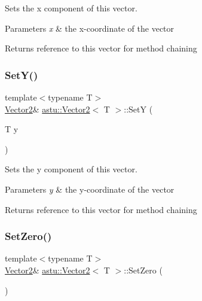 Sets the x component of this vector.


\begin{DoxyParams}{Parameters}
{\em x} & the x-\/coordinate of the vector \\
\hline
\end{DoxyParams}
\begin{DoxyReturn}{Returns}
reference to this vector for method chaining 
\end{DoxyReturn}
\mbox{\label{classastu_1_1Vector2_af454152e76948f63a433a6343b5abaef}} 
\subsubsection{\texorpdfstring{Set\+Y()}{SetY()}}
{\footnotesize\ttfamily template$<$typename T$>$ \\
\hyperlink{classastu_1_1Vector2}{Vector2}\& \hyperlink{classastu_1_1Vector2}{astu\+::\+Vector2}$<$ T $>$\+::SetY (\begin{DoxyParamCaption}\item[{T}]{y }\end{DoxyParamCaption})\hspace{0.3cm}{\ttfamily [inline]}}

Sets the y component of this vector.


\begin{DoxyParams}{Parameters}
{\em y} & the y-\/coordinate of the vector \\
\hline
\end{DoxyParams}
\begin{DoxyReturn}{Returns}
reference to this vector for method chaining 
\end{DoxyReturn}
\mbox{\label{classastu_1_1Vector2_a70eb8d4b44d3f973c5065a0ed5f9c01c}} 
\subsubsection{\texorpdfstring{Set\+Zero()}{SetZero()}}
{\footnotesize\ttfamily template$<$typename T$>$ \\
\hyperlink{classastu_1_1Vector2}{Vector2}\& \hyperlink{classastu_1_1Vector2}{astu\+::\+Vector2}$<$ T $>$\+::Set\+Zero (\begin{DoxyParamCaption}{ }\end{DoxyParamCaption})\hspace{0.3cm}{\ttfamily [inline]}}

